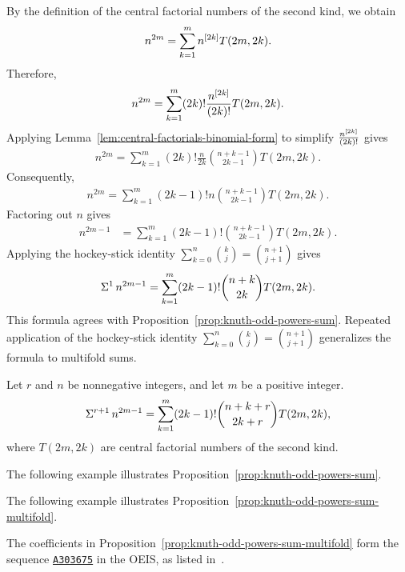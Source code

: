 By the definition of the central factorial numbers of the second kind, we obtain
\begin{align*}
  n^{2m} = \sum_{k=1}^{m} n^{[2k]} T(2m,2k).
\end{align*}
Therefore,
\begin{align*}
  n^{2m} = \sum_{k=1}^{m} (2k)! \frac{n^{[2k]}}{(2k)!} T(2m,2k).
\end{align*}
Applying Lemma~\eqref{lem:central-factorials-binomial-form} to simplify $\frac{n^{[2k]}}{(2k)!}$ gives
\begin{align*}
  n^{2m} = \sum_{k=1}^{m} (2k)!  \frac{n}{2k} \binom{n+k-1}{2k-1} T(2m,2k).
\end{align*}
Consequently,
\begin{align*}
  n^{2m} = \sum_{k=1}^{m} (2k-1)!  n \binom{n+k-1}{2k-1} T(2m,2k).
\end{align*}
Factoring out $n$ gives
\begin{align*}
  n^{2m-1}
  &= \sum_{k=1}^{m} (2k-1)! \binom{n+k-1}{2k-1} T(2m,2k).
\end{align*}
Applying the hockey-stick identity $\sum_{k=0}^{n} \binom{k}{j} = \binom{n+1}{j+1}$ gives
\begin{align*}
  \Sigma^{1}\,{n}^{2m-1} = \sum_{k=1}^{m} (2k-1)! \binom{n+k}{2k} T(2m,2k).
\end{align*}
This formula agrees with Proposition~\eqref{prop:knuth-odd-powers-sum}.
Repeated application of the hockey-stick identity $\sum_{k=0}^{n} \binom{k}{j} = \binom{n+1}{j+1}$ generalizes the formula to multifold sums.
\begin{proposition}
  \label{prop:knuth-odd-powers-sum-multifold}
  Let $r$ and $n$ be nonnegative integers, and let $m$ be a positive integer.
  \begin{align*}
    \Sigma^{r+1}\,{n}^{2m-1}
    = \sum_{k=1}^{m} (2k-1)! \binom{n+k+r}{2k+r} T(2m,2k),
  \end{align*}
  where $T(2m,2k)$ are central factorial numbers of the second kind.
\end{proposition}
The following example illustrates Proposition~\eqref{prop:knuth-odd-powers-sum}.

The following example illustrates Proposition~\eqref{prop:knuth-odd-powers-sum-multifold}.

The coefficients in Proposition~\eqref{prop:knuth-odd-powers-sum-multifold} form the sequence \href{https://oeis.org/A303675}{\texttt{A303675}} in the OEIS, as listed in~\cite{sloane2003line}.

